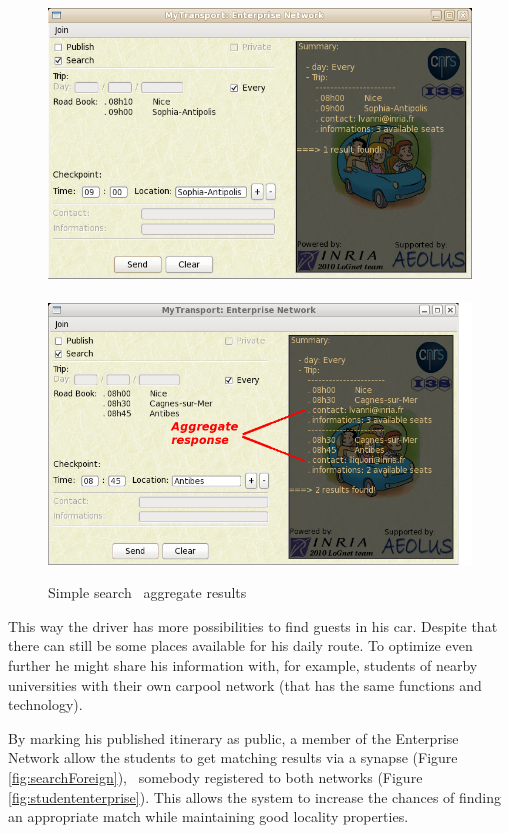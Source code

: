\begin{figure}[!t]
\begin{center}
\mbox{\includegraphics[scale=0.3]{fig/screenshot/NiceSophiaSub}
~\includegraphics[scale=0.3]{fig/screenshot/NiceCagnesAntibesSub}}
\end{center}
\caption{Simple search \vs\ aggregate results}
\label{fig:searchAggregate}
\end{figure}

This way the driver has more possibilities to find guests in his
car. Despite that there can still be some places available for his
daily route. To optimize even further he might share his information
with, for example, students of nearby universities with their own
carpool network (that has the same functions and technology).

By marking his published itinerary as public, a member of the
Enterprise Network allow the students to get matching results via a
synapse (Figure \ref{fig:searchForeign}), \ie\ somebody registered to
both networks (Figure \ref{fig:studententerprise}).  This allows the
system to increase the chances of finding an appropriate match while
maintaining good locality properties.

